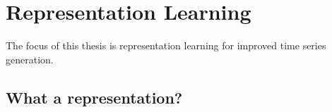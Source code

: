 \documentclass[../../thesis.tex]{subfiles}
\begin{document}









\section{Representation Learning}

The focus of this thesis is representation learning for improved time series generation.

\subsection{What a representation?}
\end{document}
